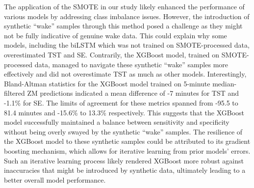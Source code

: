 \documentclass[
  10pt,
]{scrbook}
\begin{document}
The application of the SMOTE in our study likely enhanced the
performance of various models by addressing class imbalance issues.
However, the introduction of synthetic ``wake'' samples through this
method posed a challenge as they might not be fully indicative of
genuine wake data. This could explain why some models, including the
biLSTM which was not trained on SMOTE-processed data, overestimated TST
and SE. Contrarily, the XGBoost model, trained on SMOTE-processed data,
managed to navigate these synthetic ``wake'' samples more effectively
and did not overestimate TST as much as other models. Interestingly,
Bland-Altman statistics for the XGBoost model trained on 5-minute
median-filtered ZM predictions indicated a mean difference of -7 minutes
for TST and -1.1\% for SE. The limits of agreement for these metrics
spanned from -95.5 to 81.4 minutes and -15.6\% to 13.3\% respectively.
This suggests that the XGBoost model successfully maintained a balance
between sensitivity and specificity without being overly swayed by the
synthetic ``wake'' samples. The resilience of the XGBoost model to these
synthetic samples could be attributed to its gradient boosting
mechanism, which allows for iterative learning from prior models'
errors. Such an iterative learning process likely rendered XGBoost more
robust against inaccuracies that might be introduced by synthetic data,
ultimately leading to a better overall model performance.
\end{document}
